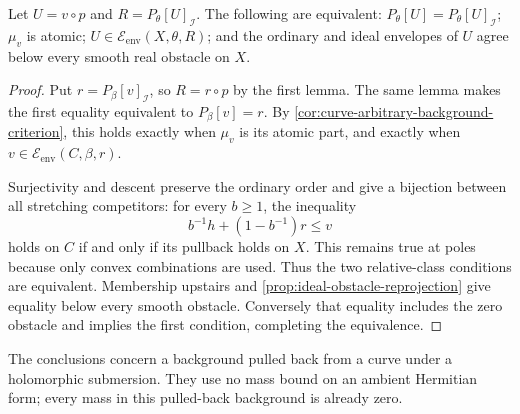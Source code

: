 \begin{corollary}\label{fibration:all-obstacle-criterion}
Let $U=v\circ p$ and $R=P_\theta[U]_{\mathcal I}$. The following
are equivalent: $P_\theta[U]=P_\theta[U]_{\mathcal I}$;
$\mu_v$ is atomic; $U\in\mathcal E_{\mathrm{env}}(X,\theta,R)$;
and the ordinary and ideal envelopes of $U$ agree below every
smooth real obstacle on $X$.
\end{corollary}
\begin{proof}
Put $r=P_\beta[v]_{\mathcal I}$, so $R=r\circ p$ by the first
lemma. The same lemma makes the first equality equivalent to
$P_\beta[v]=r$. By \cref{cor:curve-arbitrary-background-criterion},
this holds exactly when $\mu_v$ is its atomic part, and exactly
when $v\in\mathcal E_{\mathrm{env}}(C,\beta,r)$.

Surjectivity and descent preserve the ordinary order and give
a bijection between all stretching competitors: for every
$b\geq1$, the inequality
\[
 b^{-1}h+(1-b^{-1})r\leq v
\]
holds on $C$ if and only if its pullback holds on $X$.
This remains true at poles because only convex combinations
are used. Thus the two relative-class conditions are equivalent.
Membership upstairs and \cref{prop:ideal-obstacle-reprojection}
give equality below every smooth obstacle. Conversely that
equality includes the zero obstacle and implies the first
condition, completing the equivalence.
\end{proof}

The conclusions concern a background pulled back from a curve
under a holomorphic submersion. They use no mass bound on an
ambient Hermitian form; every mass in this pulled-back background
is already zero.
